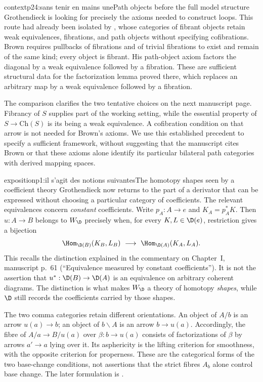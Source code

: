 \begin{dcomment}{context}{p24:sans tenir en mains une}{Path objects before the full model structure}
Grothendieck is looking for precisely the axioms needed to construct loops. This route had already been isolated by \citet[\S1, pp.~420--421]{Brown1973}, whose categories of fibrant objects retain weak equivalences, fibrations, and path objects without specifying cofibrations. Brown requires pullbacks of fibrations and of trivial fibrations to exist and remain of the same kind; every object is fibrant. His path-object axiom factors the diagonal by a weak equivalence followed by a fibration. These are sufficient structural data for the factorization lemma proved there, which replaces an arbitrary map by a weak equivalence followed by a fibration.

The comparison clarifies the two tentative choices on the next manuscript page. Fibrancy of $S$ supplies part of the working setting, while the essential property of $S\to\mathrm{Ch}(S)$ is its being a weak equivalence. A cofibration condition on that arrow is not needed for Brown's axioms. We use this established precedent to specify a sufficient framework, without suggesting that the manuscript cites Brown or that these axioms alone identify its particular bilateral path categories with derived mapping spaces.
\end{dcomment}




\begin{dcomment}{exposition}{p1:il s’agit des notions suivantes}{The homotopy shapes seen by a coefficient theory}
Grothendieck now returns to the part of a derivator that can be expressed without choosing a particular category of coefficients. The relevant equivalences concern \emph{constant} coefficients. Write $p_A:A\to e$ and $K_A=p_A^*K$. Then $u:A\to B$ belongs to $W_{\D}$ precisely when, for every $K,L\in\D(e)$, restriction gives a bijection
\[
 \Hom_{\D(B)}(K_B,L_B)\ \longrightarrow\
 \Hom_{\D(A)}(K_A,L_A).
\]
This recalls the distinction explained in the commentary on Chapter~I, manuscript p.~61 (``Equivalence measured by constant coefficients''). It is not the assertion that $u^*:\D(B)\to\D(A)$ is an equivalence on arbitrary coherent diagrams. The distinction is what makes $W_{\D}$ a theory of homotopy \emph{shapes}, while $\D$ still records the coefficients carried by those shapes.

The two comma categories retain different orientations. An object of $A/b$ is an arrow $u(a)\to b$; an object of $b\backslash A$ is an arrow $b\to u(a)$. Accordingly, the fibre of $A/a\to B/u(a)$ over $\beta:b\to u(a)$ consists of factorizations of $\beta$ by arrows $a'\to a$ lying over it. Its asphericity is the lifting criterion for smoothness, with the opposite criterion for properness. These are the categorical forms of the two base-change conditions, not assertions that the strict fibres $A_b$ alone control base change. The later formulation is \citet[Theorem~1.2 and its dual]{Maltsiniotis2005Asphericite}.
\end{dcomment}

